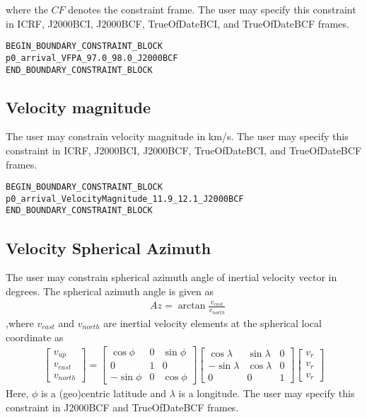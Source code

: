 \documentclass[11pt]{article}
\begin{document}
\noindent where the $CF$ denotes the constraint frame. The user may specify this constraint in ICRF, J2000BCI, J2000BCF, TrueOfDateBCI, and TrueOfDateBCF frames.

\begin{verbatim}
BEGIN_BOUNDARY_CONSTRAINT_BLOCK
p0_arrival_VFPA_97.0_98.0_J2000BCF
END_BOUNDARY_CONSTRAINT_BLOCK
\end{verbatim}

\subsection{Velocity magnitude}
\label{subsec:velocity_magnitude}
The user may constrain velocity magnitude in km/s. The user may specify this constraint in ICRF, J2000BCI, J2000BCF, TrueOfDateBCI, and TrueOfDateBCF frames.

\begin{verbatim}
BEGIN_BOUNDARY_CONSTRAINT_BLOCK
p0_arrival_VelocityMagnitude_11.9_12.1_J2000BCF
END_BOUNDARY_CONSTRAINT_BLOCK
\end{verbatim}

\subsection{Velocity Spherical Azimuth}
\label{subsec:velocity_sphericalazimuth}
The user may constrain spherical azimuth angle of inertial velocity vector in degrees. The spherical azimuth angle is given as
\begin{equation}
	\label{eq:velocity_Az}
	\begin{aligned}
		&Az = \arctan{\frac{v_{east}}{v_{north}}}
	\end{aligned}
\end{equation}
,where $v_{east}$ and $v_{north}$ are inertial velocity elements at the spherical local coordinate as
\begin{equation}
	\label{eq:velocity_local}
	\begin{aligned}
		\begin{bmatrix}
		v_{up}\\
		v_{east}\\
		v_{north}
		\end{bmatrix} =
		\begin{bmatrix}
		\cos{\phi} & 0 & \sin{\phi}\\
		0 & 1 & 0\\
		-\sin{\phi} & 0 & \cos{\phi}
		\end{bmatrix}
		\begin{bmatrix}
		\cos{\lambda} & \sin{\lambda} & 0\\
		-\sin{\lambda}& \cos{\lambda} & 0\\
		0 & 0 & 1
		\end{bmatrix}
		\begin{bmatrix}
		v_{r}\\
		v_{r}\\
		v_{r}
		\end{bmatrix}
	\end{aligned}
\end{equation}
Here, $\phi$ is a (geo)centric latitude and $\lambda$ is a longitude. The user may specify this constraint in J2000BCF and TrueOfDateBCF frames.
\end{document}
